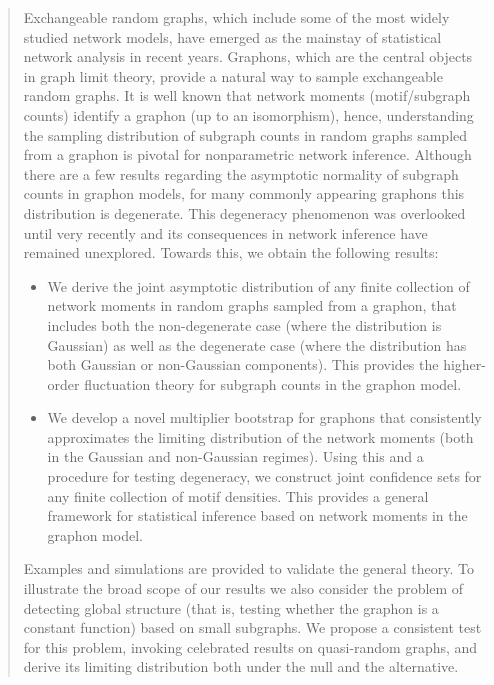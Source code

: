 \documentclass[11pt,reqno]{amsart}
\numberwithin{equation}{section}
\theoremstyle{definition}
\begin{document}
\begin{abstract} 
Exchangeable random graphs, which include some of the most widely studied network models, have emerged as the mainstay of statistical network analysis in recent years. Graphons, which are the central objects in graph limit theory, provide a natural way to sample exchangeable random graphs. It is well known that network moments (motif/subgraph counts) identify a graphon (up to an isomorphism), hence,  understanding the sampling distribution of subgraph counts in random graphs sampled from a graphon is pivotal for nonparametric network inference. Although there are a few results regarding the asymptotic normality of subgraph counts in graphon models, for many commonly appearing graphons this distribution is degenerate.  This degeneracy phenomenon was overlooked until very recently and its consequences in network inference have remained unexplored. Towards this, we obtain the following results: 

\begin{itemize} 


\item We derive the joint asymptotic distribution of any finite collection of network moments in random graphs sampled from a graphon, that includes both the non-degenerate case (where the distribution is Gaussian) as well as the degenerate case (where the distribution has both Gaussian or non-Gaussian components). This provides the higher-order fluctuation theory for subgraph counts in the graphon model. 

\item We develop a novel multiplier bootstrap for graphons that consistently  approximates the limiting distribution of the network moments (both in the Gaussian and non-Gaussian regimes). Using this and a procedure for testing degeneracy, we construct joint confidence sets for any finite collection of motif densities. This provides a general framework for statistical inference based on network moments in the graphon model. 

\end{itemize}
Examples and simulations are provided to validate the general theory.  To illustrate the broad scope of our results we also consider the problem of detecting global structure (that is, testing whether the graphon is a constant function) based on small subgraphs. We propose a consistent test for this problem, invoking celebrated results on quasi-random graphs, and derive its limiting distribution both under the null and the alternative. 
\end{abstract}
\end{document}
